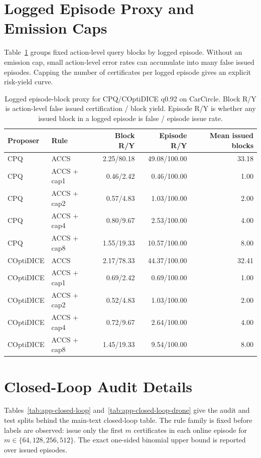 \documentclass[letterpaper]{article}
\begin{document}
\section{Logged Episode Proxy and Emission Caps}

Table~\ref{tab:app-episode-caps} groups fixed action-level query blocks by
logged episode. Without an emission cap, small action-level error rates can
accumulate into many false issued episodes. Capping the number of certificates
per logged episode gives an explicit risk-yield curve.

\begin{table}[t]
\centering
\small
\setlength{\tabcolsep}{4pt}
\begin{tabular}{llrrr}
\toprule
Proposer & Rule & Block R/Y & Episode R/Y & Mean issued blocks \\
\midrule
CPQ & ACCS & 2.25/80.18 & 49.08/100.00 & 33.18 \\
CPQ & ACCS + cap1 & 0.46/2.42 & 0.46/100.00 & 1.00 \\
CPQ & ACCS + cap2 & 0.57/4.83 & 1.03/100.00 & 2.00 \\
CPQ & ACCS + cap4 & 0.80/9.67 & 2.53/100.00 & 4.00 \\
CPQ & ACCS + cap8 & 1.55/19.33 & 10.57/100.00 & 8.00 \\
\midrule
COptiDICE & ACCS & 2.17/78.33 & 44.37/100.00 & 32.41 \\
COptiDICE & ACCS + cap1 & 0.69/2.42 & 0.69/100.00 & 1.00 \\
COptiDICE & ACCS + cap2 & 0.52/4.83 & 1.03/100.00 & 2.00 \\
COptiDICE & ACCS + cap4 & 0.72/9.67 & 2.64/100.00 & 4.00 \\
COptiDICE & ACCS + cap8 & 1.45/19.33 & 9.54/100.00 & 8.00 \\
\bottomrule
\end{tabular}
\caption{Logged episode-block proxy for CPQ/COptiDICE q0.92 on CarCircle.
Block R/Y is action-level false issued certification / block yield. Episode R/Y
is whether any issued block in a logged episode is false / episode issue rate.}
\label{tab:app-episode-caps}
\end{table}

\section{Closed-Loop Audit Details}

Tables~\ref{tab:app-closed-loop} and~\ref{tab:app-closed-loop-drone} give the
audit and test splits behind the main-text closed-loop table. The rule family
is fixed before labels are observed: issue only the first $m$ certificates in
each online episode for $m\in\{64,128,256,512\}$. The exact one-sided
binomial upper bound is reported over issued episodes.
\end{document}
